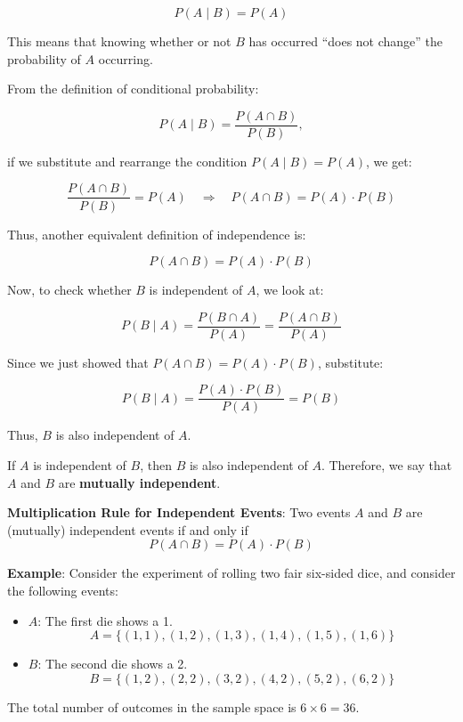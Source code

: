\documentclass[twoside]{book}
\begin{document}
$$
P(A \mid B) = P(A)
$$

This means that knowing whether or not $B$ has occurred ``does not change'' the probability of $A$ occurring.

From the definition of conditional probability:

$$
P(A \mid B) = \frac{P(A \cap B)}{P(B)},
$$

if we substitute and rearrange the condition $P(A \mid B) = P(A)$, we get:

$$
\frac{P(A \cap B)}{P(B)} = P(A) \quad \Rightarrow \quad P(A \cap B) = P(A) \cdot P(B)
$$

Thus, another equivalent definition of independence is:

$$
P(A \cap B) = P(A) \cdot P(B)
$$

Now, to check whether $B$ is independent of $A$, we look at:

$$
P(B \mid A) = \frac{P(B \cap A)}{P(A)} = \frac{P(A \cap B)}{P(A)}
$$

Since we just showed that $P(A \cap B) = P(A) \cdot P(B)$, substitute:

$$
P(B \mid A) = \frac{P(A) \cdot P(B)}{P(A)} = P(B)
$$

Thus, $B$ is also independent of $A$.

\begin{textbox}
If \( A \) is independent of \( B \), then \( B \) is also independent of \( A \). Therefore, we say that \( A \) and \( B \) are \textbf{mutually independent}.
\end{textbox}

\begin{textbox}
\textbf{Multiplication Rule for Independent Events}: Two events $A$ and $B$ are (mutually) independent events if and only if
$$P( A \cap B ) = P( A ) \cdot P( B )$$
\end{textbox}

\textbf{Example}: Consider the experiment of rolling two fair six-sided dice, and consider the following events:
\begin{itemize}
    \item \( A \): The first die shows a 1.
    \[ A = \{(1,1), (1,2), (1,3), (1,4), (1,5), (1,6)\} \]
    \item \( B \): The second die shows a 2.
    \[ B = \{(1,2), (2,2), (3,2), (4,2), (5,2), (6,2)\} \]
\end{itemize}

The total number of outcomes in the sample space is \( 6 \times 6 = 36 \).
\end{document}
